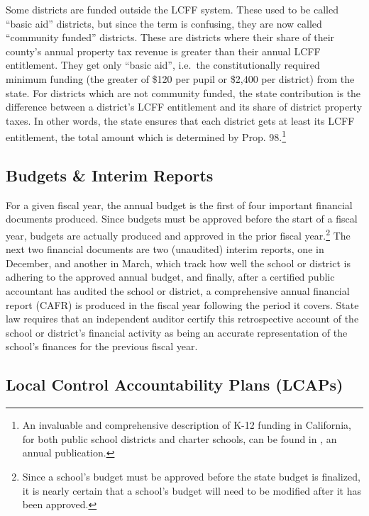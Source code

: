 Some districts are funded outside the LCFF system. These used to be called ``basic aid'' districts, but since the term is confusing, they are now called ``community funded'' districts. These are districts where their share of their county's annual property tax revenue is greater than their annual LCFF entitlement. They get only ``basic aid'', i.e.~the constitutionally required minimum funding (the greater of \$120 per pupil or \$2,400 per district) from the state. For districts which are not community funded, the state contribution is the difference between a district's LCFF entitlement and its share of district property taxes. In other words, the state ensures that each district gets at least its LCFF entitlement, the total amount which is determined by Prop. 98.\footnote{An invaluable and comprehensive description of K-12 funding in California, for both public school districts and charter schools, can be found in \textcite{Aguinaldo.etal2022}, an annual publication.}

\subsection{Budgets \& Interim Reports}\label{sec:budgets}\indent

For a given fiscal year, the annual budget is the first of four important financial documents produced. Since budgets must be approved before the start of a fiscal year, budgets are actually produced and approved in the prior fiscal year.\footnote{Since a school's budget must be approved before the state budget is finalized, it is nearly certain that a school's budget will need to be modified after it has been approved.} The next two financial documents are two (unaudited) interim reports, one in December, and another in March,  which track how well the school or district is adhering to the approved annual budget, and finally, after a certified public accountant has audited the school or district, a comprehensive annual financial report (CAFR) is produced in the fiscal year following the period it covers. State law requires that an independent auditor certify this retrospective account of the school or district's financial activity as being an accurate representation of the school's finances for the previous fiscal year.

\subsection{Local Control Accountability Plans (LCAPs)}\label{sec:lcaps}\indent


